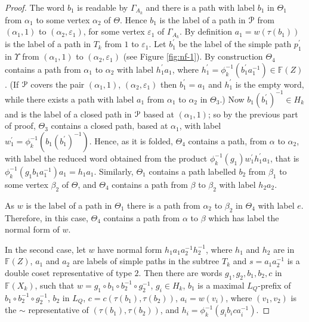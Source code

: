 \documentclass[a4paper,12pt]{article}
\renewcommand{\a}{\alpha }
\renewcommand{\b}{\beta }
\newcommand{\G}{\Gamma }
\newcommand{\e}{\varepsilon }
\newcommand{\T}{\Theta }
\renewcommand{\t}{\tau }
\newcommand{\U}{\Upsilon }
\newcommand{\cP}{{\cal{P}}}
\numberwithin{equation}{section}
\numberwithin{figure}{section}
\newcommand{\FF}{\ensuremath{\mathbb{F}}}
\begin{document}
\begin{proof}
The word $b_1$ is readable by $\G_{A_k}$ and there
is a path with label $b_1$ in $\T_1$ from $\a_1$ to some vertex $\a_2$
of $\T$.
Hence $b_1$ is the label of a path in $\cP$ from $(\a_1,1)$ to
$(\a_2,\e_1)$, for some vertex $\e_1$ of $\G_{A_k}$.
By definition $a_1=w(\t(b_1))$ is the label of a path in $T_k$ from $1$ to $\e_1$.
Let $b_1^\prime$
 be the label of the simple path $p_1^\prime$ in $\U$ from
$(\a_1,1)$ to $(\a_2,\e_1)$ (see Figure \ref{fig:nf-1}). By construction $\T_4$ contains a path
from $\a_1$ to $\a_2$ with label $h_1^\prime a_1$, where
$h_1^\prime =\phi_k^{-1}(b_1^\prime a_1^{-1})\in \FF(Z)$.
(If $\cP$ covers the pair $(\a_1,1)$, $(\a_2,\e_1)$ then
$b_1^\prime=a_1$ and $h_1^\prime$ is the empty word, while there
exists a path with label $a_1$ from $\a_1$ to $\a_2$ in $\T_3$.)
Now $b_1(b_1^\prime)^{-1}\in H_k$ and is the label of a closed
path  in $\cP$ based at $(\a_1,1)$; so by the
previous part of proof, $\T_3$ contains a closed path, based at $\a_1$,
 with label
$w_1^\prime=\phi_k^{-1}(b_1(b_1^\prime)^{-1})$. Hence, as it is folded,
$\T_4$ contains a path, from $\a$ to $\a_2$,
with label the reduced word obtained from the product
$\phi_k^{-1}(g_1)w_1^{\prime} h_1^\prime a_1$, that is
 $\phi_k^{-1}(g_1b_1a_1^{-1}) a_1=h_1a_1$.
 Similarly, $\T_1$ contains a path labelled $b_2$ from $\b_1$ to
some vertex $\b_2$ of $\T$, and $\T_4$ contains a path from
$\b$ to $\b_2$ with label $h_2a_2$.

As $w$ is the label of a path in $\T_1$ there is a path from $\a_2$ to
$\b_2$ in $\T_4$ with label $e$. Therefore, in this case, $\T_4$ contains
a path from $\a$ to $\b$ which has label the normal form of $w$.



In the second case,
let $w$ have normal form $h_1 a_1 a_2^{-1} h_2^{-1} $, where
$h_1$ and $h_2$ are in $\FF(Z)$,  $a_1$ and $a_2$ are labels
of simple paths in the subtree $T_k$ and $s=a_1a_2^{-1}$ is a double coset
representative of type $2$. Then there are words
$g_1, g_2, b_1, b_2, c$  in $\FF(X_k)$,  such that
$w=g_1\circ b_1 \circ b_2^{-1}\circ g_2^{-1}$,
$g_i\in H_k$, $b_1$ is a maximal $L_Q$-prefix of
$b_1 \circ b_2^{-1}\circ g_2^{-1}$, $b_2$ in
$L_Q$, $c=c(\t(b_1),\t(b_2))$, $a_i=w(v_i)$, where
$(v_1,v_2)$ is the $\sim$ representative of $(\t(b_1),\t(b_2))$, 
and $h_i=\phi_k^{-1}(g_ib_ica_i^{-1})$.


\end{proof}
\end{document}
